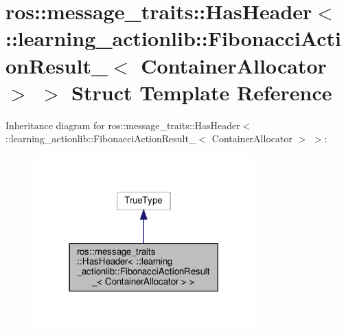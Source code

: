 \hypertarget{structros_1_1message__traits_1_1HasHeader_3_01_1_1learning__actionlib_1_1FibonacciActionResult__40241df0512b34d6b456b13d89879f6b}{}\section{ros\+:\+:message\+\_\+traits\+:\+:Has\+Header$<$ \+:\+:learning\+\_\+actionlib\+:\+:Fibonacci\+Action\+Result\+\_\+$<$ Container\+Allocator $>$ $>$ Struct Template Reference}
\label{structros_1_1message__traits_1_1HasHeader_3_01_1_1learning__actionlib_1_1FibonacciActionResult__40241df0512b34d6b456b13d89879f6b}


Inheritance diagram for ros\+:\+:message\+\_\+traits\+:\+:Has\+Header$<$ \+:\+:learning\+\_\+actionlib\+:\+:Fibonacci\+Action\+Result\+\_\+$<$ Container\+Allocator $>$ $>$\+:
\nopagebreak
\begin{figure}[H]
\begin{center}
\leavevmode
\includegraphics[width=242pt]{structros_1_1message__traits_1_1HasHeader_3_01_1_1learning__actionlib_1_1FibonacciActionResult__002450373c570b29a35ee77c9b509057}
\end{center}
\end{figure}


